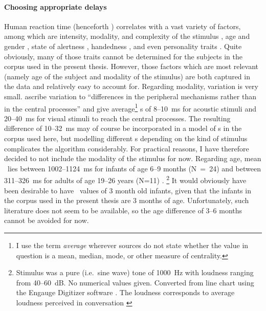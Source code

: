 \paragraph{Choosing appropriate delays}  %
Human reaction time (henceforth \rt) correlates with a vast variety of factors, among which are intensity, modality, and complexity of the stimulus \citep{brebner_introduction:_1980}, age and gender \citep{der_age_2006}, state of alertness \citep{appelle_simple_1974}, handedness \citep{dane_sex_2003}, and even personality traits \citep{stelmack_personality_1993}.
Quite obviously, many of those traits cannot be determined for the subjects in the corpus used in the present thesis.
However, those factors which are most relevant (namely age of the subject and modality of the stimulus) are both captured in the data and relatively easy to account for.
Regarding modality, variation is very small.
\citet[]{brebner_introduction:_1980} ascribe variation to ``differences in the peripheral mechanisms rather than in the central processes'' and give average\footnote{I use the term \emph{average} wherever sources do not state whether the value in question is a mean, median, mode, or other measure of centrality.} \rt s of 8--10~ms for acoustic stimuli and 20--40~ms for visual stimuli to reach the central processes.
The resulting difference of 10--32~ms may of course be incorporated in a model of \rt s in the corpus used here, but modelling different \rt s depending on the kind of stimulus complicates the algorithm considerably.
For practical reasons, I have therefore decided to not include the modality of the stimulus for now.
Regarding age, mean \rt\ lies  between 1002--1124~ms for infants of age 6--9 months (N~=~24) and between 311--326~ms for adults of age 19--26 years (N=11) \citep[]{leibold_relationship_2002}.%
\footnote{Stimulus was a pure (i.e.~sine wave) tone of 1000~Hz with loudness ranging from 40--60~dB.
No numerical values given.
Converted from line chart using the Engauge Digitizer software \citep{mitchell_engauge_2002}.
The loudness corresponds to average loudness perceived in conversation \citep[]{gorne_tontechnik:_2006}} It would obviously have been desirable to have \rt\ values of 3 month old infants, given that the infants in the  corpus used in the present thesis are 3 months of age.
Unfortunately, such literature does not seem to be available, so the age difference of 3--6 months cannot be avoided for now.
